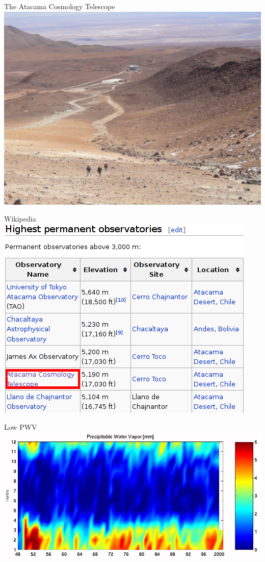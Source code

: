 \documentclass[table]{beamer}
\begin{document}
\begin{frame}{The Atacama Cosmology Telescope}
	\centering
	\includegraphics[width=\textwidth]{act_atacama_hincks.png}
\end{frame}
\begin{frame}{Wikipedia}
	\centering
	\includegraphics[width=\textwidth]{highest_observatories.png}
\end{frame}
\begin{frame}{Low PWV}
	\centering
	\includegraphics[width=\textwidth]{pwv_chajnantor_eso.jpeg}
\end{frame}
\end{document}
